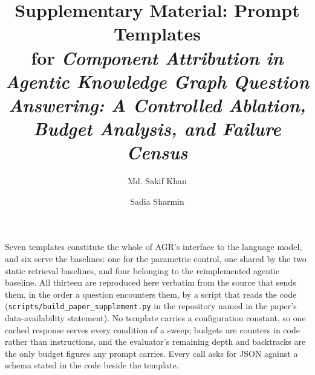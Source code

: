 \documentclass[11pt]{article}
\title{Supplementary Material: Prompt Templates\\
  \large for \emph{Component Attribution in Agentic Knowledge Graph
  Question Answering: A Controlled Ablation, Budget Analysis, and Failure
  Census}}
\author{Md. Sakif Khan \and Sadia Sharmin}
\date{}
\begin{document}
\maketitle

\noindent Seven templates constitute the whole of AGR's interface to the
language model, and six serve the baselines: one for the parametric
control, one shared by the two static retrieval baselines, and four
belonging to the reimplemented agentic baseline. All thirteen are
reproduced here verbatim from the source that sends them, in the order a
question encounters them, by a script that reads the code
(\texttt{scripts/build\_paper\_supplement.py} in the repository named in
the paper's data-availability statement). No template carries a
configuration constant, so one cached response serves every condition of
a sweep; budgets are counters in code rather than instructions, and the
evaluator's remaining depth and backtracks are the only budget figures any
prompt carries. Every call asks for JSON against a schema stated in the
code beside the template.


\end{document}
